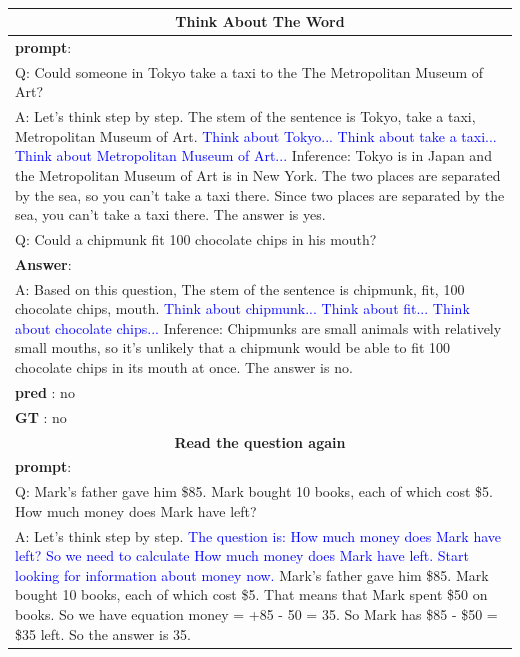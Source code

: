 \documentclass[11pt]{article}
\begin{document}
\begin{table}[!h]
\small
\caption{}
  \label{wide_table1}
  \begin{tabularx}{\textwidth}{X}
    \toprule
    \multicolumn{1}{c}{\textbf{Think About The Word}} \\\midrule
\textbf{prompt}: \\
Q: Could someone in Tokyo take a taxi to the The Metropolitan Museum of Art?\\
A: Let's think step by step. The stem of the sentence is Tokyo, take a taxi, Metropolitan Museum of Art. \textcolor{blue}{Think about Tokyo... Think about take a taxi... Think about Metropolitan Museum of Art...} Inference: Tokyo is in Japan and the Metropolitan Museum of Art is in New York. The two places are separated by the sea, so you can't take a taxi there. Since two places are separated by the sea, you can't take a taxi there. The answer is yes.  \\
      
Q: Could a chipmunk fit 100 chocolate chips in his mouth?\\\midrule
\textbf{Answer}:\\
A:
Based on this question, The stem of the sentence is chipmunk, fit, 100 chocolate chips, mouth. \textcolor{blue} {Think about chipmunk... Think about fit... Think about chocolate chips...} Inference: Chipmunks are small animals with relatively small mouths, so it's unlikely that a chipmunk would be able to fit 100 chocolate chips in its mouth at once. The answer is no.\\
\textbf{pred} : no\\
\textbf{GT} : no\\\toprule
    \multicolumn{1}{c}{\textbf{Read the question again}} \\\midrule
\textbf{prompt}: \\
Q: Mark's father gave him \$85. Mark bought 10 books, each of which cost \$5. How much money does Mark have left?\\
A: Let's think step by step. \textcolor{blue} {The question is: How much money does Mark have left? So we need to calculate How much money does Mark have left. Start looking for information about money now.} Mark's father gave him \$85. Mark bought 10 books, each of which cost \$5. That means that Mark spent \$50 on books. So we have equation money = +85 - 50 = 35. So Mark has \$85 - \$50 = \$35 left. So the answer is 35.\\
      

\end{tabularx}
\end{table}
\end{document}
